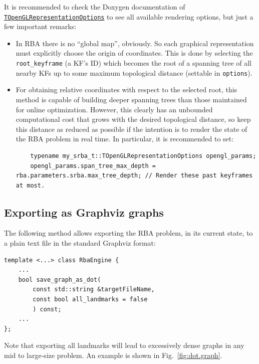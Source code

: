 \documentclass[a4paper,11pt]{article}
\begin{document}
It is recommended to check the Doxygen documentation of 
\href{http://reference.mrpt.org/svn/structmrpt_1_1srba_1_1_rba_engine_1_1_t_open_g_l_representation_options.html}
{\texttt{TOpenGLRepresentationOptions}} to see all available rendering options, but just a few important remarks:

\begin{itemize}
\item{ In RBA there is no ``global map'', obviously. So each graphical representation must explicitly choose the 
       origin of coordinates. This is done by selecting the \texttt{root\_keyframe} (a KF's ID) which becomes the 
       root of a spanning tree of all nearby KFs up to some maximum topological distance (settable in \texttt{options}).}
\item{ For obtaining relative coordinates with respect to the selected root, this method is capable of building deeper
       spanning trees than those maintained for online optimization. However, this clearly has an unbounded computational 
       cost that grows with the desired topological distance, so keep this distance as reduced as possible if the intention 
       is to render the state of the RBA problem in real time. In particular, it is recommended to set: 

\begin{lstlisting}
	typename my_srba_t::TOpenGLRepresentationOptions opengl_params;
	opengl_params.span_tree_max_depth = rba.parameters.srba.max_tree_depth; // Render these past keyframes at most.
\end{lstlisting}
}
\end{itemize}

\newpage
\subsection{Exporting as Graphviz graphs}

The following method allows exporting the RBA problem, in its current state, to a plain text 
file in the standard Graphviz format:

\begin{lstlisting}
template <...> class RbaEngine {
    ...
	bool save_graph_as_dot(
		const std::string &targetFileName,
		const bool all_landmarks = false
		) const;
    ...
};
\end{lstlisting}

Note that exporting all landmarks will lead to excessively dense graphs in any mid to large-size problem. 
An example is shown in Fig.~\ref{fig:dot.graph}.
\end{document}
